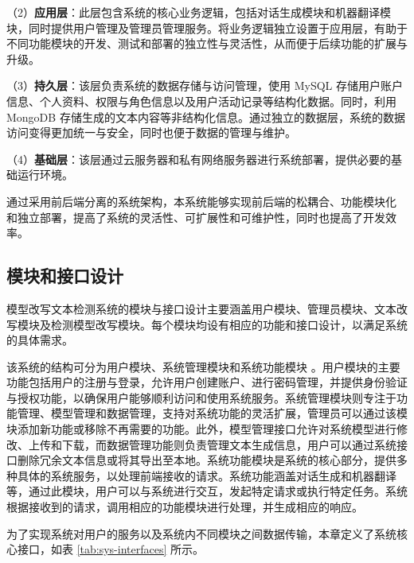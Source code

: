 （2）\textbf{应用层}：此层包含系统的核心业务逻辑，包括对话生成模块和机器翻译模块，同时提供用户管理及管理员管理服务。将业务逻辑独立设置于应用层，有助于不同功能模块的开发、测试和部署的独立性与灵活性，从而便于后续功能的扩展与升级。

（3）\textbf{持久层}：该层负责系统的数据存储与访问管理，使用 MySQL 存储用户账户信息、个人资料、权限与角色信息以及用户活动记录等结构化数据。同时，利用 MongoDB 存储生成的文本内容等非结构化信息。通过独立的数据层，系统的数据访问变得更加统一与安全，同时也便于数据的管理与维护。

（4）\textbf{基础层}：该层通过云服务器和私有网络服务器进行系统部署，提供必要的基础运行环境。

通过采用前后端分离的系统架构，本系统能够实现前后端的松耦合、功能模块化
和独立部署，提高了系统的灵活性、可扩展性和可维护性，同时也提高了开发效率。

\subsection{模块和接口设计}
\label{sec:sys-module}

模型改写文本检测系统的模块与接口设计主要涵盖用户模块、管理员模块、文本改写模块及检测模型改写模块。每个模块均设有相应的功能和接口设计，以满足系统的具体需求。

该系统的结构可分为用户模块、系统管理模块和系统功能模块
。用户模块的主要功能包括用户的注册与登录，允许用户创建账户、进行密码管理，并提供身份验证与授权功能，以确保用户能够顺利访问和使用系统服务。系统管理模块则专注于功能管理、模型管理和数据管理，支持对系统功能的灵活扩展，管理员可以通过该模块添加新功能或移除不再需要的功能。此外，模型管理接口允许对系统模型进行修改、上传和下载，而数据管理功能则负责管理文本生成信息，用户可以通过系统接口删除冗余文本信息或将其导出至本地。系统功能模块是系统的核心部分，提供多种具体的系统服务，以处理前端接收的请求。系统功能涵盖对话生成和机器翻译等，通过此模块，用户可以与系统进行交互，发起特定请求或执行特定任务。系统根据接收到的请求，调用相应的功能模块进行处理，并生成相应的响应。


为了实现系统对用户的服务以及系统内不同模块之间数据传输，本章定义了系统核心接口，如表 \ref{tab:sys-interfaces} 所示。

